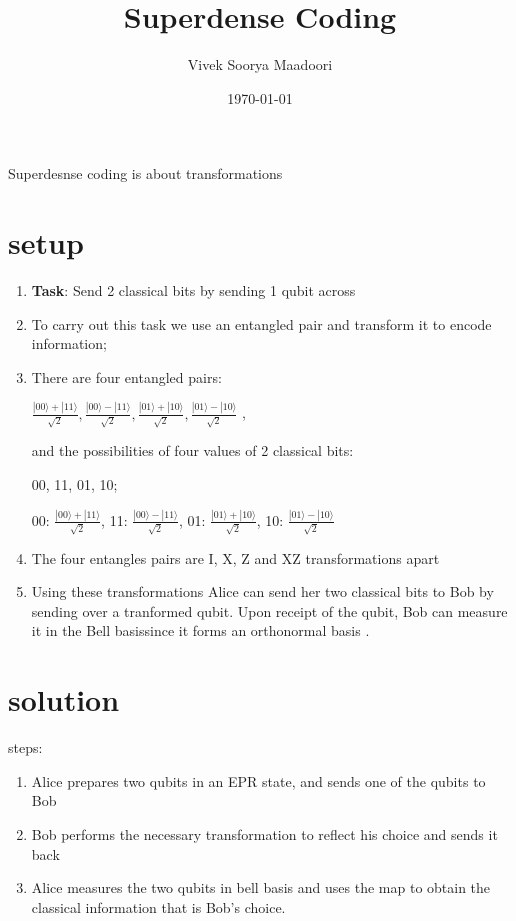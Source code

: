 \documentclass[a4paper,12pt]{amsbook}
\newcommand{\0}{{$|0\rangle$}}
\newcommand{\1}{{$|1\rangle$}}
\newcommand{\bellstates}{{$\frac{|00\rangle + |11\rangle}{\sqrt{2}}, 
\frac{|00\rangle - |11\rangle}{\sqrt{2}}, 
\frac{|01\rangle + |10\rangle}{\sqrt{2}},
\frac{|01\rangle - |10\rangle}{\sqrt{2}}$
}}
\begin{document}
\title{Superdense Coding}
\author{Vivek Soorya Maadoori}
\date{\today}
\maketitle
Superdesnse coding is about transformations

\section{setup}
\begin{enumerate}
    \item \textbf{Task}: Send 2 classical bits by sending 1 qubit across

\item To carry out this task we use an entangled pair and transform it to encode information;

\item There are four entangled pairs:

\bellstates,

and the possibilities of four values of 2 classical bits:

00, 11, 01, 10;

00: $\frac{|00\rangle + |11\rangle}{\sqrt{2}}$,
11: $\frac{|00\rangle - |11\rangle}{\sqrt{2}}$,
01: $\frac{|01\rangle + |10\rangle}{\sqrt{2}}$,
10: $\frac{|01\rangle - |10\rangle}{\sqrt{2}}$

\item The four entangles pairs are I, X, Z and XZ transformations apart \footnotemark[2] 

    \footnotemark[1]

\item Using these transformations Alice can send her two classical bits to Bob by sending over a tranformed qubit. Upon receipt of the qubit, Bob can measure it in the Bell basis\footnotemark[3] since it forms an orthonormal basis \footnotemark[4].



\end{enumerate}

\section{solution}
steps:
\begin{enumerate}
    \item Alice prepares two qubits in an EPR state, and sends one of the qubits to Bob
    \item Bob performs the necessary transformation to reflect his choice and sends it back
    \item Alice measures the two qubits in bell basis and uses the map to obtain the classical information that is Bob's choice.
\end{enumerate}
\end{document}
